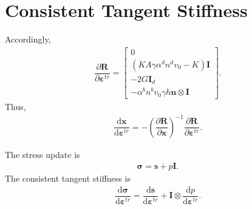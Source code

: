 \documentclass[11pt,fleqn]{article}
\newcommand*{\md}[1]{\mathrm{d}#1}
\newcommand*{\ddfrac}[2]{\dfrac{\md#1}{\md#2}}
\newcommand*{\pfrac}[2]{\dfrac{\partial#1}{\partial#2}}
\begin{document}
\section{Consistent Tangent Stiffness}
Accordingly,
\begin{gather*}
\pfrac{\mathbold{R}}{\mathbold{\varepsilon}^{tr}}=
\begin{bmatrix}
	0                                                       \\[3mm]
	\left(KA\gamma\alpha^dn^dv_0-K\right)\mathbold{I}       \\[3mm]
	-2G\mathbf{I}_{d}                                       \\[3mm]
	-\alpha^bn^bv_0\gamma{}h\mathbold{n}\otimes\mathbold{I}
\end{bmatrix}.
\end{gather*}
Thus,
\begin{gather*}
\ddfrac{\mathbold{x}}{\mathbold{\varepsilon}^{tr}}=-\left(\pfrac{\mathbold{R}}{\mathbold{x}}\right)^{-1}\pfrac{\mathbold{R}}{\mathbold{\varepsilon}^{tr}}.
\end{gather*}

The stress update is
\begin{gather*}
\mathbold{\sigma}=\mathbold{s}+p\mathbold{I}.
\end{gather*}
The consistent tangent stiffness is
\begin{gather*}
\ddfrac{\mathbold{\sigma}}{\mathbold{\varepsilon}^{tr}}=\ddfrac{\mathbold{s}}{\mathbold{\varepsilon}^{tr}}+\mathbold{I}\otimes\ddfrac{p}{\mathbold{\varepsilon}^{tr}}.
\end{gather*}
\end{document}
